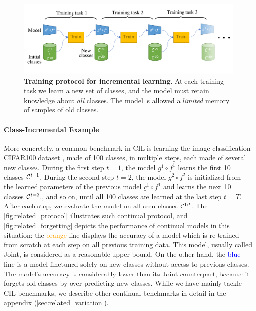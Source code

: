 \begin{figure}[tb]
      \begin{center}
            \includegraphics[width=1.0\linewidth]{images/related/protocol}
      \end{center}
      \caption{\textbf{Training protocol for incremental learning}. At each training task we learn a
            new set of classes, and the model must retain knowledge about \textit{all} classes. The
            model is allowed a \textit{limited} memory of samples of old classes.}
      \label{fig:related_protocol}
\end{figure}

\paragraph{Class-Incremental Example} More concretely, a common benchmark in \acf{CIL} is learning
the image classification CIFAR100 dataset \citep{krizhevskycifar100}, made of 100 classes, in
multiple steps, each made of several new classes. During the first step $t=1$, the model $g^1 \circ
      f^1$ learns the first 10 classes $\mathcal{C}^{t=1}$. During the second step $t=2$, the model $g^2 \circ
      f^2$ is initialized from the learned parameters of the previous model $g^1 \circ f^1$ and learns the
next 10 classes $\mathcal{C}^{t=2}$., and so on, until all 100 classes are learned at the last step $t=T$.
After each step, we evaluate the model on all seen classes $\mathcal{C}^{1:t}$.  The
\autoref{fig:related_protocol} illustrates such continual protocol, and
\autoref{fig:related_forgetting} depicts the performance of continual models in this situation: the
\textcolor{orange}{orange} line displays the accuracy of a model which is re-trained from scratch at
each step on all previous training data. This model, usually called Joint, is considered as a
reasonable upper bound. On the other hand, the \textcolor{blue}{blue} line is a model finetuned
solely on new classes without access to previous classes. The model's accuracy is considerably lower
than its Joint counterpart, because it forgets old classes by over-predicting new classes. While we
have mainly tackle \acf{CIL} benchmarks, we describe other continual benchmarks in detail in the
appendix (\autoref{sec:related_variation}).

